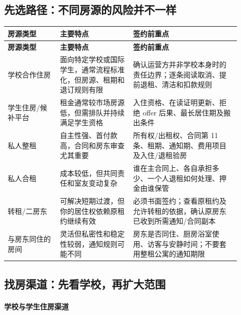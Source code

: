 \subsection{先选路径：不同房源的风险并不一样}

\small
{}
\begin{longtable}{p{0.20\linewidth}p{0.29\linewidth}p{0.41\linewidth}}
  \toprule
  \textbf{房源类型} & \textbf{主要特点} & \textbf{签约前重点} \\
  \midrule
  \endfirsthead
  \toprule
  \textbf{房源类型} & \textbf{主要特点} & \textbf{签约前重点} \\
  \midrule
  \endhead
  \bottomrule
  \endfoot
  学校合作住房 & 面向特定学校或国际学生，通常流程标准化，但房源、租期和退订规则有限 & 确认运营方并非学校本身时的责任边界；逐条阅读取消、提前退租、清洁和扣款规则 \\
  学生住房/候补平台 & 租金通常较市场房源低，但需排队并持续满足学生资格 & 入住资格、在读证明更新、拒绝 offer 后果、最长居住期及搬出条件 \\
  私人整租 & 自主性强、首付款高，合同和房东审查尤其重要 & 所有权/出租权、合同第 11 条、租期、通知期、费用项目及入住/退租验房 \\
  私人合租 & 成本较低，但共同责任和室友变动复杂 & 谁在主合同上、各自承担多少、一个人退租如何处理、押金由谁保管 \\
  转租/二房东 & 可解决短期过渡，但你的居住权依赖原租约继续有效 & 必须书面签约；查看原租约及允许转租的依据，确认原房东已收到所需通知/合同副本 \\
  与房东同住的房间 & 灵活但私密性和稳定性较弱，通知规则可能不同 & 房东是否同住、厨房浴室使用、访客与安静时间；不要套用整租公寓的通知期限 \\
\end{longtable}
\normalsize

\subsection{找房渠道：先看学校，再扩大范围}

\paragraph{学校与学生住房渠道}

